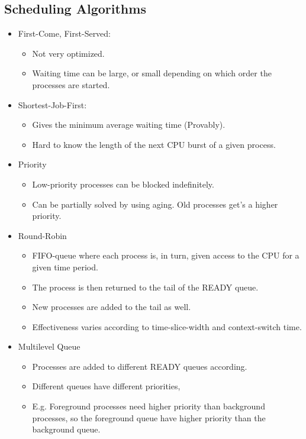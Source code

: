 \documentclass[a4wide,10pt]{article}
\begin{document}
\subsection{Scheduling Algorithms} %
\label{sub:scheduling_algorithms}
\begin{itemize}
	\item First-Come, First-Served:
	\begin{itemize}
		\item Not very optimized.
		\item Waiting time can be large, or small depending on which order the processes are started.
	\end{itemize}
	\item Shortest-Job-First:
	\begin{itemize}
		\item Gives the minimum average waiting time (Provably).
		\item Hard to know the length of the next CPU burst of a given process.
	\end{itemize}
	\item Priority
	\begin{itemize}
		\item Low-priority processes can be blocked indefinitely.
		\item Can be partially solved by using aging. Old processes get's a higher priority.
	\end{itemize}
	\item Round-Robin
	\begin{itemize}
		\item FIFO-queue where each process is, in turn, given access to the CPU for a given time period.
		\item The process is then returned to the tail of the READY queue.
		\item New processes are added to the tail as well.
		\item Effectiveness varies according to time-slice-width and context-switch time.
	\end{itemize}
	\item Multilevel Queue
	\begin{itemize}
		\item Processes are added to different READY queues according.
		\item Different queues have different priorities,
		\item E.g. Foreground processes need higher priority than background processes, so the foreground queue have higher priority than the background queue.

\end{itemize}
\end{itemize}
\end{document}

